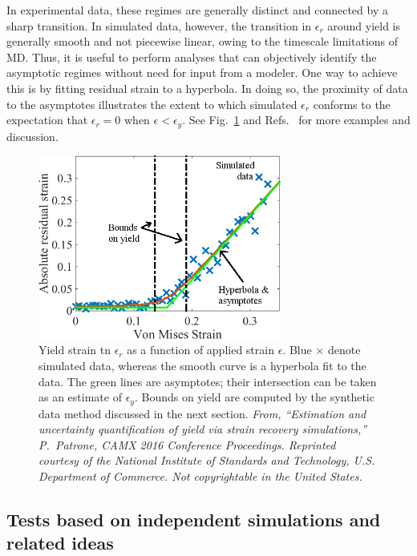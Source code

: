 In experimental data, these regimes are generally distinct and connected by a sharp transition.  In simulated data, however, the transition in $\epsilon_r$ around yield is generally smooth and not piecewise linear, owing to the timescale limitations of MD.  Thus, it is useful to perform analyses that can objectively identify the asymptotic regimes without need for input from a modeler.  One way to achieve this is by fitting residual strain to a hyperbola.  In doing so, the proximity of data to the asymptotes illustrates the extent to which simulated $\epsilon_r$ conforms to the expectation that $\epsilon_r=0$ when $\epsilon < \epsilon_y$.  See Fig.~\ref{fig:yield} and Refs.~\cite{patrone1,patrone2} for more examples and discussion.

\begin{figure}
\includegraphics[width=8cm]{hyperbola.png}\caption{Yield strain tn $\epsilon_r$ as a function of applied strain $\epsilon$.  Blue $\times$ denote simulated data, whereas the smooth curve is a hyperbola fit to the data.  The green lines are asymptotes; their intersection can be taken as an estimate of $\epsilon_y$.    Bounds on yield are computed by the synthetic data method discussed in the next section.  {\it From, ``Estimation and uncertainty quantification of yield via strain recovery simulations,'' P.\ Patrone, CAMX 2016 Conference Proceedings.  Reprinted courtesy of the National Institute of Standards and Technology, U.S. Department of Commerce. Not copyrightable in the United States.}}\label{fig:yield}
\end{figure}

\subsection{Tests based on independent simulations and related ideas}

